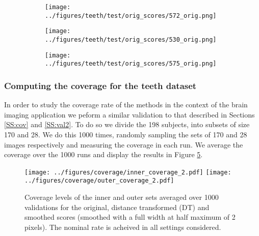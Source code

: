 \begin{figure}[h!]
	\begin{subfigure}{0.16\textwidth}
		\centering
		\texttt{[image: ../figures/teeth/test/orig\_scores/572\_orig.png]}
		\label{fig:1}
	\end{subfigure}
	\begin{subfigure}{0.16\textwidth}
		\centering
		\texttt{[image: ../figures/teeth/test/orig\_scores/530\_orig.png]}
		\label{fig:1}
	\end{subfigure}
	\begin{subfigure}{0.16\textwidth}
		\centering
		\texttt{[image: ../figures/teeth/test/orig\_scores/575\_orig.png]}
		\label{fig:1}
	\end{subfigure}
	\caption{}\label{fig:teethorig}
\end{figure}

\subsubsection{Computing the coverage for the teeth dataset}
In order to study the coverage rate of the methods in the context of the brain imaging application we peform a similar validation to that described in Sections \ref{SS:cov} and \ref{SS:val2}. To do so we divide the 198 subjects, into subsets of size 170 and 28. We do this 1000 times, randomly sampling the sets of 170 and 28 images respectively and measuring the coverage in each run. We average the coverage over the 1000 runs and display the results in Figure \ref{fig:coverage3}.
\begin{figure}[h!]
	\begin{center}
		\texttt{[image: ../figures/coverage/inner\_coverage\_2.pdf]}
		\texttt{[image: ../figures/coverage/outer\_coverage\_2.pdf]}
	\end{center}
	\caption{Coverage levels of the inner and outer sets averaged over 1000 validations for the original, distance transformed (DT) and smoothed scores (smoothed with a full width at half maximum of 2 pixels). The nominal rate is acheived in all settings considered.}\label{fig:coverage3}
\end{figure}

